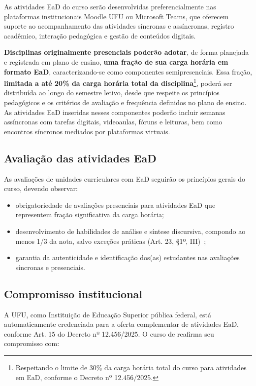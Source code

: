 As atividades EaD do curso serão desenvolvidas preferencialmente nas plataformas institucionais Moodle UFU ou Microsoft Teams, que oferecem suporte ao acompanhamento das atividades síncronas e assíncronas, registro acadêmico, interação pedagógica e gestão de conteúdos digitais.

\textbf{Disciplinas originalmente presenciais poderão adotar}, de forma planejada e registrada em plano de ensino, \textbf{uma fração de sua carga horária em formato EaD}, caracterizando-se como componentes semipresenciais. Essa fração, \textbf{limitada a até 20\% da carga horária total da disciplina}\footnote{Respeitando o limite de 30\% da carga horária total do curso para atividades em EaD, conforme o Decreto nº 12.456/2025.}, poderá ser distribuída ao longo do semestre letivo, desde que respeite os princípios pedagógicos e os critérios de avaliação e frequência definidos no plano de ensino. As atividades EaD inseridas nesses componentes poderão incluir semanas assíncronas com tarefas digitais, videoaulas, fóruns e leituras, bem como encontros síncronos mediados por plataformas virtuais.

\subsection{Avaliação das atividades EaD}

As avaliações de unidades curriculares com EaD seguirão os princípios gerais do curso, devendo observar:

\begin{itemize}
    \item obrigatoriedade de avaliações presenciais para atividades EaD que representem fração significativa da carga horária;
    \item desenvolvimento de habilidades de análise e síntese discursiva, compondo ao menos 1/3 da nota, salvo exceções práticas (Art. 23, §1º, III)~\cite{Decreto:12456:2025};
    \item garantia da autenticidade e identificação dos(as) estudantes nas avaliações síncronas e presenciais.
\end{itemize}

\subsection{Compromisso institucional}

A UFU, como Instituição de Educação Superior pública federal, está automaticamente credenciada para a oferta complementar de atividades EaD, conforme Art. 15 do Decreto nº 12.456/2025. O curso de \nomecursonovo reafirma seu compromisso com:


